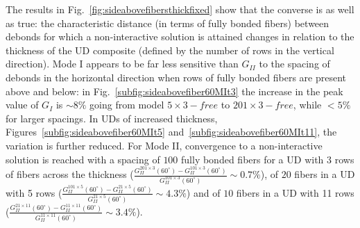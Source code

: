\documentclass[review]{elsarticle}
\begin{document}
The results in Fig.~\ref{fig:sideabovefibersthickfixed} show that the converse is as well as true: the characteristic distance (in terms of fully bonded fibers) between debonds for which a non-interactive solution is attained changes in relation to the thickness of the UD composite (defined by the number of rows in the vertical direction). Mode I appears to be far less sensitive than $G_{II}$ to the spacing of debonds in the horizontal direction when rows of fully bonded fibers are present above and below: in Fig.~\ref{subfig:sideabovefiber60MIt3} the increase in the peak value of $G_{I}$ is $\sim 8\%$ going from model $5\times 3-free$ to $201\times 3-free$, while $<5\%$ for larger spacings. In UDs of increased thickness, Figures~\ref{subfig:sideabovefiber60MIt5} and~\ref{subfig:sideabovefiber60MIt11}, the variation is further reduced. For Mode II, convergence to a non-interactive solution is reached with a spacing of $100$ fully bonded fibers for a UD with 3 rows of fibers across the thickness ($\frac{G_{II}^{201\times 3}\left(60^{\circ}\right)-G_{II}^{101\times 3}\left(60^{\circ}\right)}{G_{II}^{101\times 3}\left(60^{\circ}\right)}\sim0.7\%$), of $20$ fibers in a UD with 5 rows ($\frac{G_{II}^{101\times 5}\left(60^{\circ}\right)-G_{II}^{21\times 5}\left(60^{\circ}\right)}{G_{II}^{21\times 5}\left(60^{\circ}\right)}\sim4.3\%$) and of $10$ fibers in a UD with 11 rows ($\frac{G_{II}^{21\times 11}\left(60^{\circ}\right)-G_{II}^{11\times 11}\left(60^{\circ}\right)}{G_{II}^{11\times 11}\left(60^{\circ}\right)}\sim3.4\%$).

%
\end{document}
